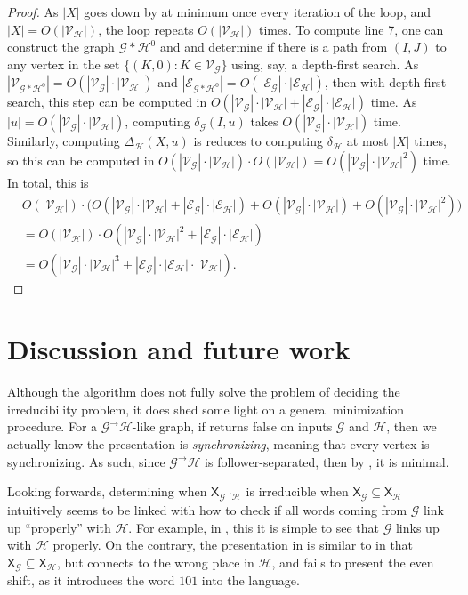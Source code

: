 \documentclass[hidelinks]{report}
\newcommand{\Gc}{\mathcal{G}}  %
\newcommand{\Hc}{\mathcal{H}}  %
\newcommand{\Vc}{\mathcal{V}}
\newcommand{\Ec}{\mathcal{E}}
\newcommand{\GtH}{{\Gc^\to\Hc}}
\newcommand{\shift}[1]{\mathsf{X}_{#1}}
\newcommand{\term}[1]{\textit{#1}}
\theoremstyle{definition}
\begin{document}
\begin{proof}
    As \(|X|\) goes down by at minimum once every iteration of the loop, 
    and \(|X| = O(|\Vc_\Hc|)\), the loop repeats \(O(|\Vc_\Hc|)\) times. To compute line 7, 
    one can construct the graph \(\Gc * \Hc^0\) and and determine 
    if there is a path from \((I, J)\) to any vertex in the set 
    \(\{(K, 0) : K \in \Vc_\Gc\}\) using, say, a depth-first search.
    As \(|\Vc_{\Gc * \Hc^0}| = O(|\Vc_\Gc|\cdot|\Vc_\Hc|)\) and 
    \(|\Ec_{\Gc * \Hc^0}| = O(|\Ec_\Gc|\cdot|\Ec_\Hc|)\), then with 
    depth-first search, this step can be computed in \(O(|\Vc_\Gc|\cdot|\Vc_\Hc| + |\Ec_\Gc|\cdot|\Ec_\Hc|)\)
    time. As \(|u| = O(|\Vc_\Gc|\cdot|\Vc_\Hc|)\), computing \(\delta_\Gc(I, u)\) 
    takes \(O(|\Vc_\Gc|\cdot|\Vc_\Hc|)\) time. Similarly, computing 
    \(\Delta_\Hc(X, u)\) is reduces to computing \(\delta_\Hc\) at most \(|X|\) times, so 
    this can be computed in \(O(|\Vc_\Gc|\cdot|\Vc_\Hc|)\cdot O(|\Vc_\Hc|) = O(|\Vc_\Gc| \cdot |\Vc_\Hc|^2)\) time.
    In total, this is 
    \begin{align*}
        & O(|\Vc_\Hc|)\cdot \big( O(|\Vc_\Gc|\cdot|\Vc_\Hc| + |\Ec_\Gc|\cdot|\Ec_\Hc|) + O(|\Vc_\Gc|\cdot|\Vc_\Hc|) + O(|\Vc_\Gc|\cdot|\Vc_\Hc|^2)\big)
        \\ &= O(|\Vc_\Hc|)\cdot O(|\Vc_\Gc|\cdot|\Vc_\Hc|^2 + |\Ec_\Gc|\cdot|\Ec_\Hc|) \\ 
        &= O(|\Vc_\Gc|\cdot|\Vc_\Hc|^3 + |\Ec_\Gc|\cdot|\Ec_\Hc|\cdot|\Vc_\Hc|).
    \end{align*}
\end{proof}

\chapter{Discussion and future work}

Although the algorithm does not fully solve the problem of deciding 
the irreducibility problem, it does shed some light on a general minimization 
procedure. For a \(\GtH\)-like graph, if  returns 
false on inputs \(\Gc\) and \(\Hc\), then we actually know the presentation 
is \term{synchronizing}, meaning that every vertex is synchronizing.
As such, since \(\GtH\) is follower-separated, then by
\cite[Corollary 5.4]{jonoska1996sofic}, it is minimal.

Looking forwards, determining when \(\shift{\GtH}\) is irreducible when 
\(\shift{\Gc} \subseteq \shift{\Hc}\) intuitively seems to be linked 
with how to check if all words coming from \(\Gc\) link up ``properly''
with \(\Hc\). For example, in , this it is 
simple to see that \(\Gc\) links up with \(\Hc\) properly.
On the contrary, the presentation in  is similar 
to  in that \(\shift{\Gc} \subseteq \shift{\Hc}\),
but connects to the wrong place in \(\Hc\), and fails to 
present the even shift, as it introduces the word 
\(101\) into the language.
\end{document}
